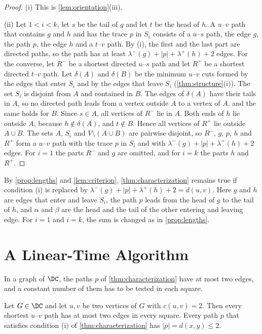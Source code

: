 \begin{proof}
(i) This is \cref{lem:orientation}(iii).

(ii) Let $1 < i < k$, let $s$ be the tail of $g$ and let $t$ be the head of $h$.
A $u$--$v$ path that contains $g$ and $h$ and has the trace $p$ in $S_i$ consists of a $u$--$s$ path, the edge $g$, the path $p$, the edge $h$ and a $t$--$v$ path.
By (i), the first and the last part are directed paths, so the path has at least $\lambda^{-}(g) + |p| + \lambda^{+}(h) + 2$ edges.
For the converse, let $R^{-}$ be a shortest directed $u$--$s$ path and let $R^{+}$ be a shortest directed $t$--$v$ path.
Let $\delta(A)$ and $\delta(B)$ be the minimum $u$--$v$ cuts formed by the edges that enter $S_i$ and by the edges that leave $S_i$ (\cref{thm:structure}(i)).
The set $S_i$ is disjoint from $A$ and contained in $B$.
The edges of $\delta(A)$ have their tails in $A$, so no directed path leads from a vertex outside $A$ to a vertex of $A$, and the same holds for $B$.
Since $s \in A$, all vertices of $R^{-}$ lie in $A$.
Both ends of $h$ lie outside $A$, because $h \notin \delta(A)$, and $t \notin B$.
Hence all vertices of $R^{+}$ lie outside $A \cup B$.
The sets $A$, $S_i$ and $V \setminus (A \cup B)$ are pairwise disjoint, so $R^{-}$, $g$, $p$, $h$ and $R^{+}$ form a $u$--$v$ path with the trace $p$ in $S_i$ and with $\lambda^{-}(g) + |p| + \lambda^{+}(h) + 2$ edges.
For $i = 1$ the parts $R^{-}$ and $g$ are omitted, and for $i = k$ the parts $h$ and $R^{+}$.
\end{proof}

By \cref{prop:lengths} and \cref{lem:criterion}, \cref{thm:characterization} remains true if condition (i) is replaced by $\lambda^{-}(g) + |p| + \lambda^{+}(h) + 2 = d(u, v)$.
Here $g$ and $h$ are edges that enter and leave $S_i$, the path $p$ leads from the head of $g$ to the tail of $h$, and $\alpha$ and $\beta$ are the head and the tail of the other entering and leaving edge.
For $i = 1$ and $i = k$, the sum is changed as in \cref{prop:lengths}.

\section{A Linear-Time Algorithm}
\label{sec:algorithm}

In a graph of $\DC$, the paths $p$ of \cref{thm:characterization} have at most two edges, and a constant number of them has to be tested in each square.

\begin{corollary}
\label{cor:two-edges}
Let $G \in \DC$ and let $u, v$ be two vertices of $G$ with $c(u, v) = 2$.
Then every shortest $u$--$v$ path has at most two edges in every square.
Every path $p$ that satisfies condition (i) of \cref{thm:characterization} has $|p| = d(x, y) \leq 2$.
\end{corollary}

